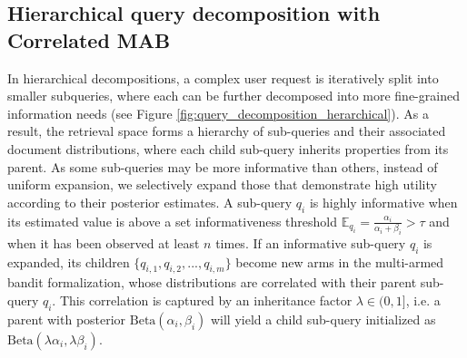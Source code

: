 \subsection{Hierarchical query decomposition with Correlated MAB}\label{sec:hierarchical_method}

In hierarchical decompositions, a complex user request is iteratively split into smaller subqueries, where each can be further decomposed into more fine-grained information needs (see Figure \ref{fig:query_decomposition_herarchical}). As a result, the retrieval space forms a hierarchy of sub-queries and their associated document distributions, where each child sub-query inherits properties from its parent. As some sub-queries may be more informative than others, instead of uniform expansion, we selectively expand those that demonstrate high utility according to their posterior estimates. A sub-query \(q_i\) is highly informative when its estimated value is above a set informativeness threshold \(\mathbb{E}_{q_i} = \frac{\alpha_i}{\alpha_i + \beta_i} > \tau\) and when it has been observed at least \(n\) times. If an informative sub-query \(q_i\) is expanded, its children \(\{q_{i, 1}, q_{i, 2}, ..., q_{i, m}\}\) become new arms in the multi-armed bandit formalization, whose distributions are correlated with their parent sub-query \(q_i\). This correlation is captured by an inheritance factor \(\lambda \in (0, 1]\), i.e. a parent with posterior \(\text{Beta}(\alpha_i, \beta_i)\) will yield a child sub-query initialized as \(\text{Beta}(\lambda \alpha_i, \lambda \beta_i)\). 


